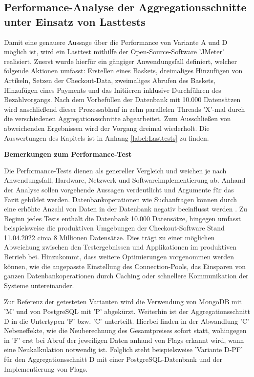 \subsection{Performance-Analyse der Aggregationsschnitte unter Einsatz von Lasttests}

Damit eine genauere Aussage über die Performance von Variante A und D möglich ist, wird ein Lasttest mithilfe der Open-Source-Software 'JMeter' realisiert. Zuerst wurde hierfür ein gängiger Anwendungsfall definiert, welcher folgende Aktionen umfasst: Erstellen eines Baskets, dreimaliges Hinzufügen von Artikeln, Setzen der Checkout-Data, zweimaliges Abrufen des Baskets, Hinzufügen eines Payments und das Initiieren inklusive Durchführen des Bezahlvorgangs. Nach dem Vorbefüllen der Datenbank mit 10.000 Datensätzen wird anschließend dieser Prozessablauf in zehn parallelen Threads 'X'-mal durch die verschiedenen Aggregationsschnitte abgearbeitet. Zum Ausschließen von abweichenden Ergebnissen wird der Vorgang dreimal wiederholt. Die Auswertungen des Kapitels ist in Anhang \ref{label:Lasttests} zu finden.

\textbf{Bemerkungen zum Performance-Test}

Die Performance-Tests dienen als genereller Vergleich und weichen je nach Anwendungsfall, Hardware, Netzwerk und Softwareimplementierung ab. Anhand der Analyse sollen vorgehende Aussagen verdeutlicht und Argumente für das Fazit gebildet werden. Datenbankoperationen wie Suchanfragen können durch eine erhöhte Anzahl von Daten in der Datenbank negativ beeinflusst werden . Zu Beginn jedes Tests enthält die Datenbank 10.000 Datensätze, hingegen umfasst beispielsweise die produktiven Umgebungen der Checkout-Software Stand 11.04.2022 circa 8 Millionen Datensätze. Dies trägt zu einer möglichen Abweichung zwischen den Testergebnissen und Applikationen im produktiven Betrieb bei. Hinzukommt, dass weitere Optimierungen vorgenommen werden können, wie die angepasste Einstellung des \Gls{Connection-Pool}s, das Einsparen von ganzen Datenbankoperationen durch Caching oder schnellere Kommunikation der Systeme untereinander. 

Zur Referenz der getesteten Varianten wird die Verwendung von MongoDB mit 'M' und von PostgreSQL mit 'P' abgekürzt. Weiterhin ist der Aggregationsschnitt D in die Untertypen 'F' bzw. 'C' unterteilt. Hierbei finden in der Abwandlung 'C' Nebeneffekte, wie die Neuberechnung des Gesamtpreises sofort statt, wohingegen in 'F' erst bei Abruf der jeweiligen Daten anhand von Flags erkannt wird, wann eine Neukalkulation notwendig ist. Folglich steht beispielsweise 'Variante D-PF' für den Aggregationsschnitt D mit einer PostgreSQL-Datenbank und der Implementierung von Flags.

